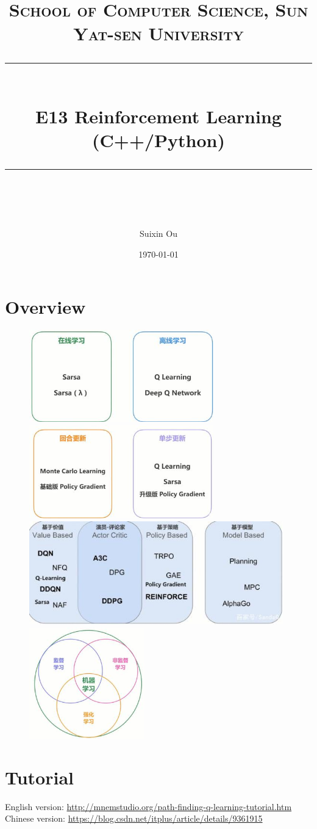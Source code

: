 \documentclass[a4paper, 11pt]{article}
\title{	
\normalfont \normalsize
\textsc{School of Computer Science, Sun Yat-sen University} \\ [25pt] %
\rule{\textwidth}{0.5pt} \\[0.4cm] %
\huge  E13 Reinforcement Learning (C++/Python)\\ %
\rule{\textwidth}{2pt} \\[0.5cm] %
\author{Suixin Ou}
\date{\normalsize\today}
}
\begin{document}
\maketitle
\tableofcontents
\newpage
\section{Overview}
\begin{figure}[ht]
\centering
\includegraphics[width=8cm]{Pic/on_off}
\quad
\includegraphics[width=8cm]{Pic/update}
\includegraphics[width=11cm]{Pic/base}
\quad
\includegraphics[width=5cm]{Pic/relation}
\end{figure}
\section{Tutorial}
English version: \url{http://mnemstudio.org/path-finding-q-learning-tutorial.htm}\\
Chinese version: \url{https://blog.csdn.net/itplus/article/details/9361915}
\end{document}
